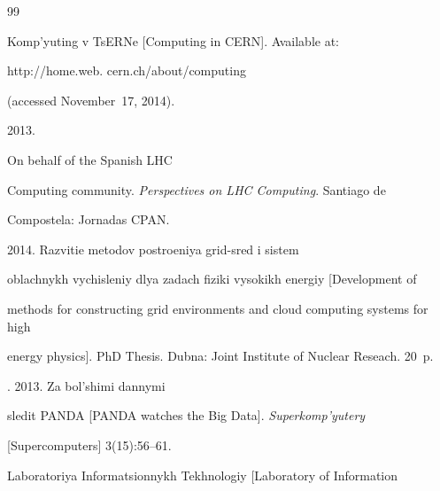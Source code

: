 







\renewcommand{\bibname}{\protect\rmfamily References}







{\small\frenchspacing


{%




\begin{thebibliography}{99}




Komp'yuting v TsERNe [Computing in CERN]. Available at: {\sf


http://home.web. cern.ch/about/computing} (accessed November~17, 2014).




 2013.


 On behalf of the Spanish LHC


Computing community. \textit{Perspectives on LHC Computing}. Santiago de


Compostela: Jornadas CPAN.  %




 2014. Razvitie metodov postroeniya grid-sred i sistem


oblachnykh vychisleniy dlya zadach fiziki vysokikh energiy [Development of


methods for constructing grid environments and cloud computing systems for high


energy physics]. PhD Thesis. Dubna: Joint Institute of Nuclear Reseach. 20~p.




. 2013. Za bol'shimi dannymi


sle\-dit PANDA [PANDA watches the Big Data]. \textit{Superkomp'yutery}


[Supercomputers] 3(15):56--61.




Laboratoriya Informatsionnykh Tekhnologiy [Laboratory of Information



\end{thebibliography}}}
